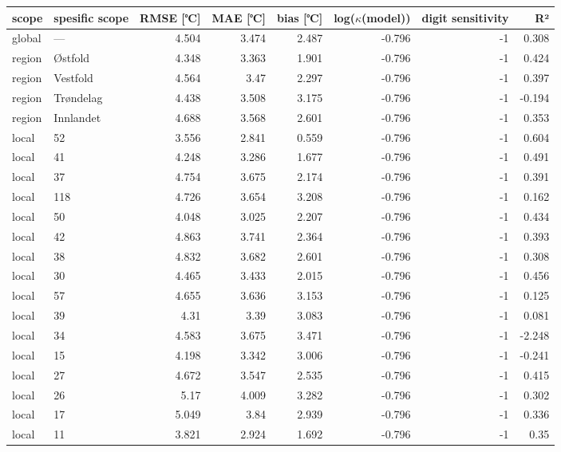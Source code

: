 \begin{tabular}{llrrrrrr}
\hline
 scope   & spesific
scope           &       RMSE
[℃] &   MAE [℃] &       bias
[℃] &   log($\kappa$(model)) &    digit
sensitivity &     R² \\
\hline
 global  & ---       & 4.504 &     3.474 & 2.487 &                 -0.796 & -1 &  0.308 \\
 region  & Østfold   & 4.348 &     3.363 & 1.901 &                 -0.796 & -1 &  0.424 \\
 region  & Vestfold  & 4.564 &     3.47  & 2.297 &                 -0.796 & -1 &  0.397 \\
 region  & Trøndelag & 4.438 &     3.508 & 3.175 &                 -0.796 & -1 & -0.194 \\
 region  & Innlandet & 4.688 &     3.568 & 2.601 &                 -0.796 & -1 &  0.353 \\
 local   & 52        & 3.556 &     2.841 & 0.559 &                 -0.796 & -1 &  0.604 \\
 local   & 41        & 4.248 &     3.286 & 1.677 &                 -0.796 & -1 &  0.491 \\
 local   & 37        & 4.754 &     3.675 & 2.174 &                 -0.796 & -1 &  0.391 \\
 local   & 118       & 4.726 &     3.654 & 3.208 &                 -0.796 & -1 &  0.162 \\
 local   & 50        & 4.048 &     3.025 & 2.207 &                 -0.796 & -1 &  0.434 \\
 local   & 42        & 4.863 &     3.741 & 2.364 &                 -0.796 & -1 &  0.393 \\
 local   & 38        & 4.832 &     3.682 & 2.601 &                 -0.796 & -1 &  0.308 \\
 local   & 30        & 4.465 &     3.433 & 2.015 &                 -0.796 & -1 &  0.456 \\
 local   & 57        & 4.655 &     3.636 & 3.153 &                 -0.796 & -1 &  0.125 \\
 local   & 39        & 4.31  &     3.39  & 3.083 &                 -0.796 & -1 &  0.081 \\
 local   & 34        & 4.583 &     3.675 & 3.471 &                 -0.796 & -1 & -2.248 \\
 local   & 15        & 4.198 &     3.342 & 3.006 &                 -0.796 & -1 & -0.241 \\
 local   & 27        & 4.672 &     3.547 & 2.535 &                 -0.796 & -1 &  0.415 \\
 local   & 26        & 5.17  &     4.009 & 3.282 &                 -0.796 & -1 &  0.302 \\
 local   & 17        & 5.049 &     3.84  & 2.939 &                 -0.796 & -1 &  0.336 \\
 local   & 11        & 3.821 &     2.924 & 1.692 &                 -0.796 & -1 &  0.35  \\
\hline
\end{tabular}
